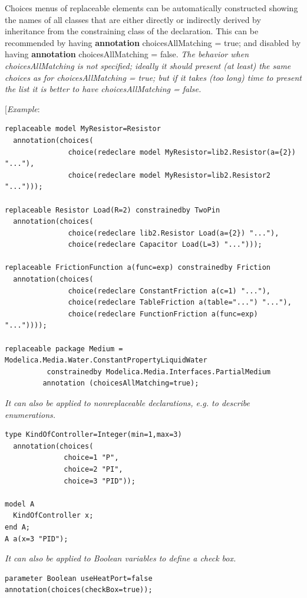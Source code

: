 \documentclass[10pt,a4paper]{report}
\begin{document}
Choices menus of replaceable elements can be automatically constructed
showing the names of all classes that are either directly or indirectly
derived by inheritance from the constraining class of the declaration.
This can be recommended by having \textbf{annotation} choicesAllMatching
= true; and disabled by having \textbf{annotation} choicesAllMatching =
false. \emph{The behavior when choicesAllMatching is not specified;
ideally it should present (at least) the same choices as for
choicesAllMatching = true; but if it takes (too long) time to present
the list it is better to have choicesAllMatching = false.}

{[}\emph{Example}:
\begin{lstlisting}[language=modelica]
replaceable model MyResistor=Resistor
  annotation(choices(
               choice(redeclare model MyResistor=lib2.Resistor(a={2}) "..."),
               choice(redeclare model MyResistor=lib2.Resistor2 "...")));
	       
replaceable Resistor Load(R=2) constrainedby TwoPin
  annotation(choices(
               choice(redeclare lib2.Resistor Load(a={2}) "..."),
               choice(redeclare Capacitor Load(L=3) "...")));
	       
replaceable FrictionFunction a(func=exp) constrainedby Friction
  annotation(choices(
               choice(redeclare ConstantFriction a(c=1) "..."),
               choice(redeclare TableFriction a(table="...") "..."),
               choice(redeclare FunctionFriction a(func=exp) "..."))));
	       
replaceable package Medium = Modelica.Media.Water.ConstantPropertyLiquidWater
          constrainedby Modelica.Media.Interfaces.PartialMedium 
	     annotation (choicesAllMatching=true);
\end{lstlisting}

\emph{It can also be applied to nonreplaceable declarations, e.g. to
describe enumerations.}
\begin{lstlisting}[language=modelica]
type KindOfController=Integer(min=1,max=3)
  annotation(choices(
              choice=1 "P",
              choice=2 "PI",
              choice=3 "PID"));
	      
model A
  KindOfController x;
end A;
A a(x=3 "PID");
\end{lstlisting}

\emph{It can also be applied to Boolean variables to define a check
box.}
\begin{lstlisting}[language=modelica]
parameter Boolean useHeatPort=false annotation(choices(checkBox=true));
\end{lstlisting}
\end{document}
